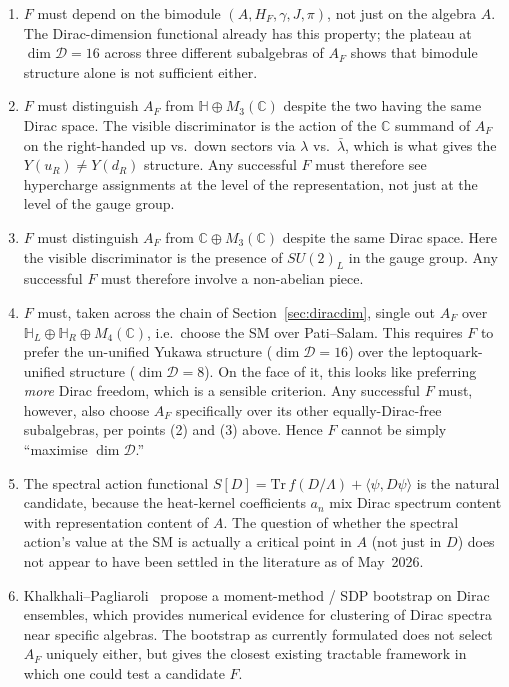\documentclass[11pt,a4paper]{article}
\begin{document}
\begin{enumerate}[leftmargin=2em]
  \item $F$ must depend on the bimodule $(A, H_F, \gamma, J, \pi)$, not just on
        the algebra $A$. The Dirac-dimension functional already has this
        property; the plateau at $\dim \mathcal{D} = 16$ across three different
        subalgebras of $A_F$ shows that bimodule structure alone is not
        sufficient either.
  \item $F$ must distinguish $A_F$ from $\mathbb{H} \oplus M_3(\mathbb{C})$
        despite the two having the same Dirac space.
        The visible discriminator is the action of the $\mathbb{C}$ summand of
        $A_F$ on the right-handed up vs.\ down sectors via $\lambda$ vs.\
        $\bar\lambda$, which is what gives the $Y(u_R) \neq Y(d_R)$ structure.
        Any successful $F$ must therefore see hypercharge assignments at the
        level of the representation, not just at the level of the gauge group.
  \item $F$ must distinguish $A_F$ from $\mathbb{C} \oplus M_3(\mathbb{C})$
        despite the same Dirac space. Here the visible discriminator is the
        presence of $SU(2)_L$ in the gauge group. Any successful $F$ must
        therefore involve a non-abelian piece.
  \item $F$ must, taken across the chain of Section~\ref{sec:diracdim}, single
        out $A_F$ over $\mathbb{H}_L \oplus \mathbb{H}_R \oplus M_4(\mathbb{C})$,
        i.e.\ choose the SM over Pati--Salam. This requires
        $F$ to prefer the un-unified Yukawa structure
        ($\dim \mathcal{D} = 16$) over the leptoquark-unified structure
        ($\dim \mathcal{D} = 8$). On the face of it, this looks like preferring
        \emph{more} Dirac freedom, which is a sensible criterion. Any
        successful $F$ must, however, also choose $A_F$ specifically over its
        other equally-Dirac-free subalgebras, per points (2) and (3) above.
        Hence $F$ cannot be simply ``maximise $\dim \mathcal{D}$.''
  \item The spectral action functional
        $S[D] = \mathrm{Tr}\, f(D/\Lambda) + \langle \psi, D\psi \rangle$
        is the natural candidate, because the heat-kernel coefficients
        $a_n$ mix Dirac spectrum content with representation content of $A$.
        The question of whether the spectral action's value at the SM is
        actually a critical point in $A$ (not just in $D$) does not appear to
        have been settled in the literature as of May~2026.
  \item Khalkhali--Pagliaroli~\cite{khalkhali-pagliaroli} propose a moment-method
        / SDP bootstrap on Dirac ensembles, which provides numerical evidence
        for clustering of Dirac spectra near specific algebras. The bootstrap
        as currently formulated does not select $A_F$ uniquely either, but
        gives the closest existing tractable framework in which one could test
        a candidate $F$.
\end{enumerate}
\end{document}
